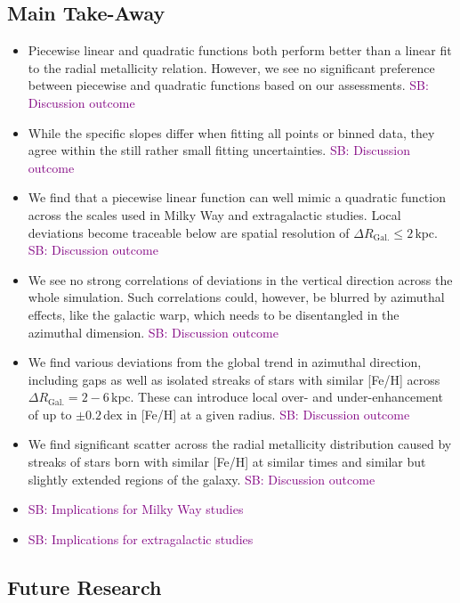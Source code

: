 \documentclass[fleqn,usenatbib]{mnras}
\newcommand{\SB}[1]{{\textcolor{purple}{SB: #1}}}
\begin{document}
\subsection{Main Take-Away}

\begin{itemize}
    \item Piecewise linear and quadratic functions both perform better than a linear fit to the radial metallicity relation. However, we see no significant preference between piecewise and quadratic functions based on our assessments. \SB{Discussion outcome}
    \item While the specific slopes differ when fitting all points or binned data, they agree within the still rather small fitting uncertainties. \SB{Discussion outcome}
    \item We find that a piecewise linear function can well mimic a quadratic function across the scales used in Milky Way and extragalactic studies. Local deviations become traceable below are spatial resolution of $\Delta R_\mathrm{Gal.} \leq 2\,\mathrm{kpc}$. \SB{Discussion outcome}
    \item We see no strong correlations of deviations in the vertical direction across the whole simulation. Such correlations could, however, be blurred by azimuthal effects, like the galactic warp, which needs to be disentangled in the azimuthal dimension. \SB{Discussion outcome}
    \item We find various deviations from the global trend in azimuthal direction, including gaps as well as isolated streaks of stars with similar [Fe/H] across $\Delta R_\mathrm{Gal.} = 2-6\,\mathrm{kpc}$. These can introduce local over- and under-enhancement of up to $\pm 0.2\,\mathrm{dex}$ in [Fe/H] at a given radius. \SB{Discussion outcome}
    \item We find significant scatter across the radial metallicity distribution caused by streaks of stars born with similar [Fe/H] at similar times and similar but slightly extended regions of the galaxy. \SB{Discussion outcome}
    \item \SB{Implications for Milky Way studies}
    \item \SB{Implications for extragalactic studies}
\end{itemize}

\subsection{Future Research}
\end{document}
